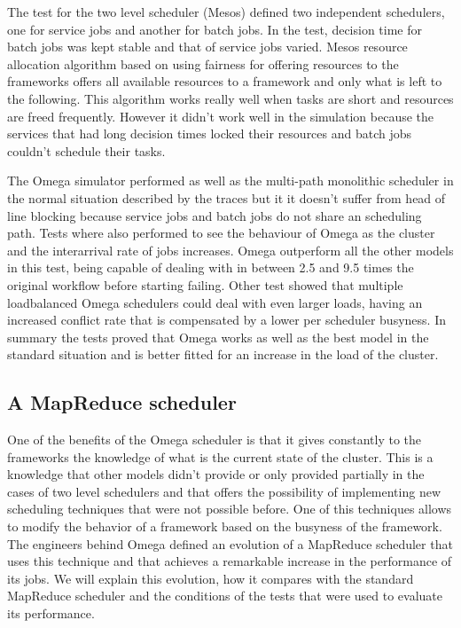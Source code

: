 \documentclass{article}                     %
\begin{document}
The test for the two level scheduler (Mesos) defined two independent
schedulers, one for service jobs and another for batch jobs. In the
test, decision time for batch jobs was kept stable and that of service
jobs varied. Mesos resource allocation algorithm based on using
fairness for offering resources to the frameworks offers all available
resources to a framework and only what is left to the following. This
algorithm works really well when tasks are short and resources are
freed frequently. However it didn't work well in the simulation
because the services that had long decision times locked their
resources and batch jobs couldn't schedule their tasks.

The Omega simulator performed as well as the multi-path monolithic
scheduler in the normal situation described by the traces but it it
doesn't suffer from head of line blocking because service jobs and
batch jobs do not share an scheduling path. Tests where also performed
to see the behaviour of Omega as the cluster and the interarrival rate
of jobs increases. Omega outperform all the other models in this test,
being capable of dealing with in between 2.5 and 9.5 times the
original workflow before starting failing. Other test showed that
multiple loadbalanced Omega schedulers could deal with even larger
loads, having an increased conflict rate that is compensated by a
lower per scheduler busyness. In summary the tests proved that Omega
works as well as the best model in the standard situation and is
better fitted for an increase in the load of the cluster.

\subsection{A MapReduce scheduler}

One of the benefits of the Omega scheduler is that it gives constantly
to the frameworks the knowledge of what is the current state of the
cluster. This is a knowledge that other models didn't provide or only
provided partially in the cases of two level schedulers and that
offers the possibility of implementing new scheduling techniques that
were not possible before. One of this techniques allows to modify the
behavior of a framework based on the busyness of the framework. The
engineers behind Omega defined an evolution of a MapReduce scheduler
that uses this technique and that achieves a remarkable increase in
the performance of its jobs. We will explain this evolution, how it
compares with the standard MapReduce scheduler and the conditions of
the tests that were used to evaluate its performance.
\end{document}

